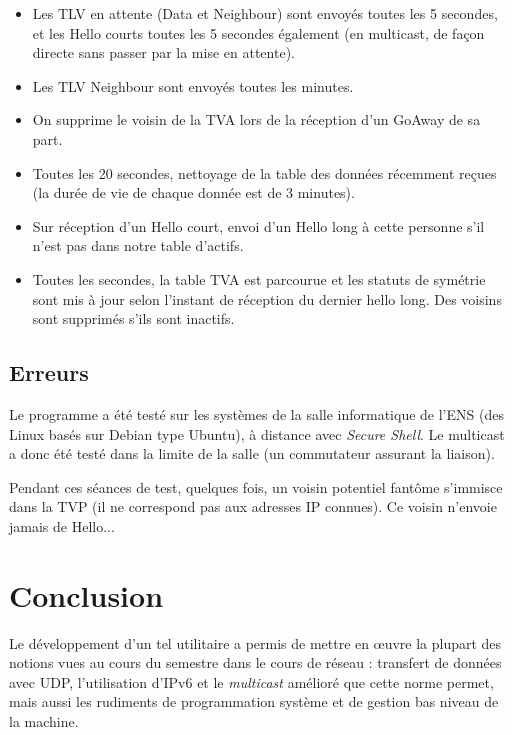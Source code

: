 \documentclass[11pt,a4paper]{article}
\begin{document}
	\begin{itemize}
		\item 	Les TLV en attente (Data et Neighbour) sont envoyés toutes les 5 secondes, et les Hello courts toutes les 5 secondes également (en multicast, de façon 	directe sans passer par la mise en attente).
		
		\item Les TLV Neighbour sont envoyés toutes les minutes.
	
	\item On supprime le voisin de la TVA lors de la réception d'un GoAway de sa part.
	
	\item Toutes les 20 secondes, nettoyage de la table des données récemment reçues (la durée de vie de chaque donnée est de 3 minutes).
	
	\item Sur réception d'un Hello court, envoi d'un Hello long à cette personne s'il n'est pas dans notre table d'actifs.
	
	\item  Toutes les secondes, la table TVA est parcourue et les statuts de symétrie sont mis à jour selon l'instant de réception du dernier hello long.
	Des voisins sont supprimés s'ils sont inactifs.

	\end{itemize}
	
	\subsection{Erreurs}
	
	Le programme a été testé sur les systèmes de la salle informatique de l'ENS (des Linux basés sur Debian type Ubuntu), à distance avec \emph{Secure Shell}.
	Le multicast a donc été testé dans la limite de la salle (un commutateur assurant la liaison).
	
	Pendant ces séances de test, quelques fois, un voisin potentiel fantôme s'immisce dans la TVP (il ne correspond pas aux adresses IP connues). Ce voisin n'envoie
	jamais de Hello...
	
\section{Conclusion}
	
	Le développement d'un tel utilitaire a permis de mettre en œuvre la plupart des notions vues au cours du semestre dans le cours
	de réseau : transfert de données avec UDP, l'utilisation d'IPv6 et le \emph{multicast} amélioré que cette norme permet, mais aussi les rudiments
	 de programmation système et de gestion bas niveau de la machine.
	
\end{document}
